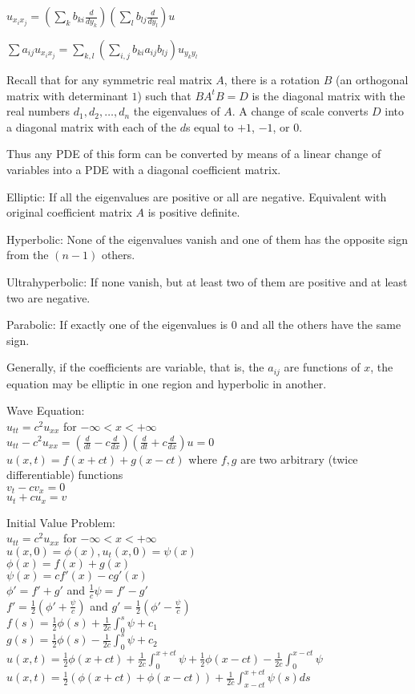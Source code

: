 $u_{x_i x_j} = \left(\sum_k b_{ki} \frac{d}{dy_k} \right) \left(\sum_l b_{lj} \frac{d}{dy_l} \right) u$

$\sum a_{ij} u_{x_i x_j}=\sum_{k,l} \left(\sum_{i,j} b_{ki} a_{ij} b_{lj} \right) u_{y_k y_l}$

Recall that for any symmetric real matrix $A$, there is a rotation $B$ (an orthogonal matrix with determinant $1$) such that $BA^{t}B=D$ is the diagonal matrix with the real numbers $d_1,d_2,\dots,d_n$ the eigenvalues of $A$. A change of scale converts $D$ into a diagonal matrix with each of the $d$s equal to $+1$, $-1$, or $0$.

Thus any PDE of this form can be converted by means of a linear change of variables into a PDE with a diagonal coefficient matrix.

Elliptic: If all the eigenvalues are positive or all are negative. Equivalent with original coefficient matrix $A$ is positive definite.

Hyperbolic: None of the eigenvalues vanish and one of them has the opposite sign from the $(n-1)$ others.

Ultrahyperbolic: If none vanish, but at least two of them are positive and at least two are negative.

Parabolic: If exactly one of the eigenvalues is $0$ and all the others have the same sign.

Generally, if the coefficients are variable, that is, the $a_{ij}$ are functions of $x$, the equation may be elliptic in one region and hyperbolic in another.

Wave Equation: \\
$u_{tt}=c^2 u_{xx}$ for $-\infty < x < +\infty$ \\
$u_{tt}-c^2 u_{xx} = \left(\frac{d}{dt}-c\frac{d}{dx} \right) \left( \frac{d}{dt}+c\frac{d}{dx} \right) u = 0$ \\
$u(x,t) = f(x+ct) + g(x-ct)$ where $f,g$ are two arbitrary (twice differentiable) functions \\
$v_t - cv_x = 0$ \\
$u_t + cu_x = v$

Initial Value Problem: \\
$u_{tt} = c^2 u_{xx}$ for $ -\infty < x < +\infty$ \\
$u(x,0) = \phi (x), u_t (x,0) = \psi (x)$ \\
$\phi (x) = f(x) + g(x)$ \\
$\psi (x) = cf'(x) - cg'(x)$ \\
$\phi'=f'+g'$ and $\frac{1}{c} \psi = f'-g'$ \\
$f'=\frac{1}{2} \left(\phi'+\frac{\psi}{c} \right)$ and $g'=\frac{1}{2} \left(\phi'-\frac{\psi}{c} \right)$ \\
$f(s)=\frac{1}{2} \phi (s)+\frac{1}{2c}\int_0^s \psi + c_1$ \\
$g(s)=\frac{1}{2} \phi (s)-\frac{1}{2c}\int_0^s \psi + c_2$ \\
$u(x,t) = \frac{1}{2} \phi (x+ct) + \frac{1}{2c} \int_0^{x+ct} \psi + \frac{1}{2} \phi (x-ct) - \frac{1}{2c} \int_0^{x-ct} \psi$ \\
$u(x,t) = \frac{1}{2} (\phi (x+ct) + \phi (x-ct)) + \frac{1}{2c} \int_{x-ct}^{x+ct} \psi (s) ds$

